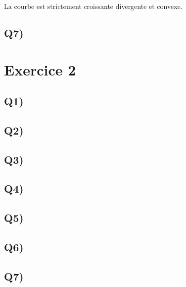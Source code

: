 \documentclass[12pt,a4paper]{article}
\begin{document}
La courbe est strictement croissante divergente et convexe.

\subsection*{Q7)}


\section*{Exercice 2}
\subsection*{Q1)}

\subsection*{Q2)}

\subsection*{Q3)}

\subsection*{Q4)}

\subsection*{Q5)}

\subsection*{Q6)}

\subsection*{Q7)}
\end{document}
